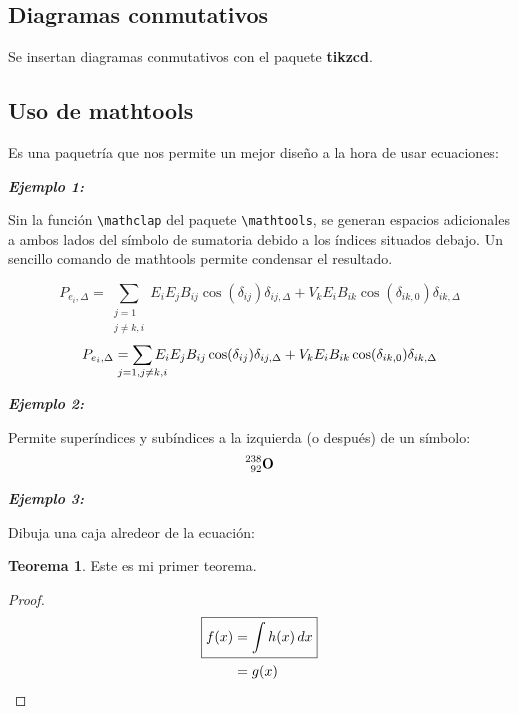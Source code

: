 \documentclass[10pt]{book}
\theoremstyle{definition}
\theoremstyle{theorem}
\newtheorem{teo}[defi]{Teorema}
\theoremstyle{remark}
\begin{document}
\subsection{Diagramas conmutativos}
Se insertan diagramas conmutativos con el paquete {\bfseries {\sffamily tikzcd}}.




\subsection{Uso de mathtools}
Es una paquetría que nos permite un mejor diseño a la hora de usar ecuaciones:

{\bfseries\itshape Ejemplo 1:}


Sin la función \verb+\mathclap+ del paquete \verb+\mathtools+, se generan espacios adicionales a ambos lados del símbolo de sumatoria debido a los índices situados debajo. Un sencillo comando de mathtools permite condensar el resultado.

\[
P_{e_i,\Delta} = \sum_{\substack{j=1 \\ j\neq k,i}} E_i E_j B_{ij} \cos(\delta_{ij}) \delta_{ij,\Delta} + V_k E_i B_{ik} \cos(\delta_{ik,0}) \delta_{ik,\Delta}
\]
\[
P_{e_i,\Delta} = \sum_{\mathclap{j=1, j\neq k, i}} E_i E_j B_{ij} \cos(\delta_{ij}) \delta_{ij,\Delta} + V_k E_i B_{ik} \cos(\delta_{ik,0}) \delta_{ik,\Delta}
\]


{\bfseries\itshape Ejemplo 2:}

Permite superíndices y subíndices a la izquierda (o después) de un símbolo:
\[
\prescript{238}{92}{\mathbf{O}}
\]


{\bfseries\itshape Ejemplo 3:}

Dibuja una caja alredeor de la ecuación:

\begin{teo}
    Este es mi primer teorema.
\end{teo}
\begin{proof}
    \begin{align*}
\Aboxed{ f(x) & = \int h(x)\, dx} \\
              & = g(x)
\end{align*}
\end{proof}




\nocite{*}


\printbibliography
\end{document}
